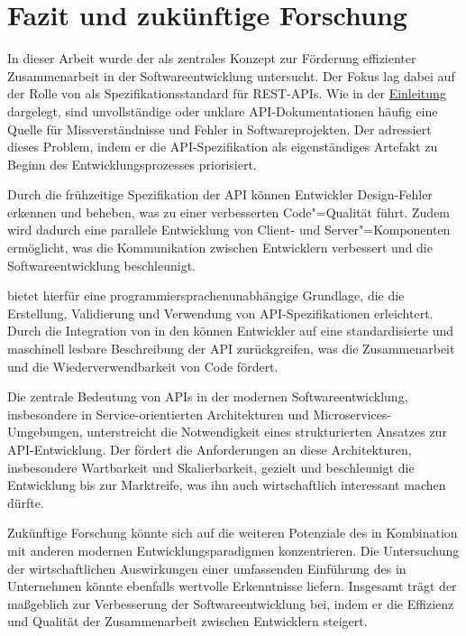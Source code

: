 \chapter{Fazit und zukünftige Forschung}
In dieser Arbeit wurde der \AFA als zentrales Konzept zur Förderung effizienter Zusammenarbeit in der Softwareentwicklung untersucht.
Der Fokus lag dabei auf der Rolle von \OA als Spezifikationsstandard für \ac{REST}-\acp{API}.
Wie in der \hyperref[ch:introduction]{Einleitung} dargelegt, sind unvollständige oder unklare \ac{API}-Dokumentationen häufig eine Quelle für Missverständnisse und Fehler in Softwareprojekten.
Der \AFA adressiert dieses Problem, indem er die \ac{API}-Spezifikation als eigenständiges Artefakt zu Beginn des Entwicklungsprozesses priorisiert.

Durch die frühzeitige Spezifikation der \ac{API} können Entwickler Design-Fehler erkennen und beheben, was zu einer verbesserten Code"=Qualität führt.
Zudem wird dadurch eine parallele Entwicklung von Client- und Server"=Komponenten ermöglicht, was die Kommunikation zwischen Entwicklern verbessert und die Softwareentwicklung beschleunigt.

\OA bietet hierfür eine programmiersprachenunabhängige Grundlage, die die Erstellung, Validierung und Verwendung von \ac{API}-Spezifikationen erleichtert.
Durch die Integration von \OA in den \AFA können Entwickler auf eine standardisierte und maschinell lesbare Beschreibung der \ac{API} zurückgreifen, was die Zusammenarbeit und die Wiederverwendbarkeit von Code fördert.

Die zentrale Bedeutung von \acp{API} in der modernen Softwareentwicklung, insbesondere in Service-orientierten Architekturen und Microservices-Umgebungen, unterstreicht die Notwendigkeit eines strukturierten Ansatzes zur \ac{API}-Entwicklung.
Der \AFA fördert die Anforderungen an diese Architekturen, insbesondere Wartbarkeit und Skalierbarkeit, gezielt und beschleunigt die Entwicklung bis zur Marktreife, was ihn auch wirtschaftlich interessant machen dürfte.

Zukünftige Forschung könnte sich auf die weiteren Potenziale des \AFAes in Kombination mit anderen modernen Entwicklungsparadigmen konzentrieren.
Die Untersuchung der wirtschaftlichen Auswirkungen einer umfassenden Einführung des \AFAes in Unternehmen könnte ebenfalls wertvolle Erkenntnisse liefern.
Insgesamt trägt der \AFA maßgeblich zur Verbesserung der Softwareentwicklung bei, indem er die Effizienz und Qualität der Zusammenarbeit zwischen Entwicklern steigert.